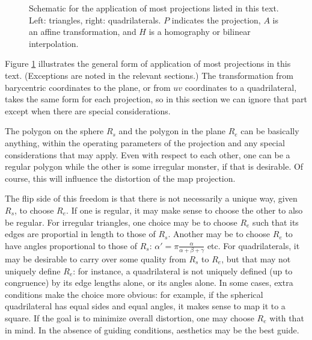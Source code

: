 \documentclass{amsart}[12pt]
\begin{document}
\begin{figure}
\caption{Schematic for the application of most projections listed in this text.
Left: triangles, right: quadrilaterals. $P$ indicates the projection, $A$ is an affine transformation, and $H$ is a homography or bilinear interpolation.}
\label{fig:schematic}
\end{figure}

Figure \ref{fig:schematic} illustrates the general form of application of most
projections in this text. (Exceptions are noted in the relevant sections.) The
transformation from barycentric coordinates to the plane, or from $uv$
coordinates to a quadrilateral, takes the same form for each projection, so in
this section we can ignore that part except when there are special
considerations.

The polygon on the sphere $R_s$ and the polygon in the plane $R_e$ can be
basically anything, within the operating parameters of the projection and any
special considerations that may apply. Even with respect to each other, one
can be a regular polygon while the other is some irregular monster, if that is
desirable. Of course, this will influence the distortion of the map
projection.

The flip side of this freedom is that there is not
necessarily a unique way, given $R_s$, to choose $R_e$. If one is regular,
it may make sense to choose the other to also be regular. For irregular
triangles, one choice may be to choose $R_e$ such that its edges are
proportial in length to those of $R_s$. Another may be to choose $R_e$ to have
angles proportional to those of $R_s$: $\alpha' = \pi
\frac{\alpha}{\alpha+\beta+\gamma}$ etc. For quadrilaterals, it may be
desirable to carry over some quality from $R_s$ to $R_e$, but that may not
uniquely define $R_e$: for instance, a quadrilateral is not uniquely defined
(up to congruence) by its edge lengths alone, or its angles alone. In some
cases, extra conditions make the choice more obvious: for example, if the
spherical quadrilateral has equal sides and equal angles, it makes sense to
map it to a square. If the goal is to minimize overall distortion, one may
choose $R_e$ with that in mind. In the absence of guiding conditions,
aesthetics may be the best guide.
\end{document}
